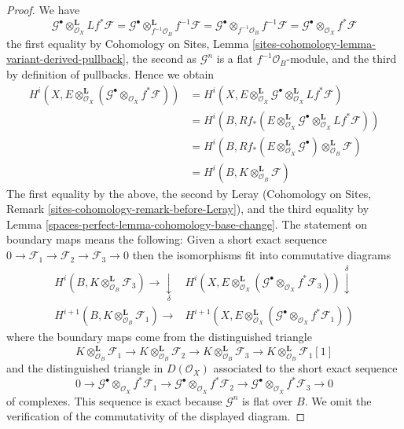 \begin{proof}
We have
$$
\mathcal{G}^\bullet \otimes_{\mathcal{O}_X}^\mathbf{L} Lf^*\mathcal{F} =
\mathcal{G}^\bullet \otimes_{f^{-1}\mathcal{O}_B}^\mathbf{L} f^{-1}\mathcal{F} =
\mathcal{G}^\bullet \otimes_{f^{-1}\mathcal{O}_B} f^{-1}\mathcal{F} =
\mathcal{G}^\bullet \otimes_{\mathcal{O}_X} f^*\mathcal{F}
$$
the first equality by
Cohomology on Sites, Lemma
\ref{sites-cohomology-lemma-variant-derived-pullback},
the second as $\mathcal{G}^n$ is a flat $f^{-1}\mathcal{O}_B$-module, and
the third by definition of pullbacks. Hence we obtain
\begin{align*}
H^i(X, E \otimes^\mathbf{L}_{\mathcal{O}_X}
(\mathcal{G}^\bullet \otimes_{\mathcal{O}_X} f^*\mathcal{F}))
& =
H^i(X, E \otimes^\mathbf{L}_{\mathcal{O}_X} \mathcal{G}^\bullet
\otimes_{\mathcal{O}_X}^\mathbf{L} Lf^*\mathcal{F}) \\
& =
H^i(B,
Rf_*(E \otimes^\mathbf{L}_{\mathcal{O}_X} \mathcal{G}^\bullet
\otimes^\mathbf{L}_{\mathcal{O}_X} Lf^*\mathcal{F})) \\
& =
H^i(B,
Rf_*(E \otimes^\mathbf{L}_{\mathcal{O}_X} \mathcal{G}^\bullet)
\otimes^\mathbf{L}_{\mathcal{O}_B} \mathcal{F}) \\
& =
H^i(B, K \otimes^\mathbf{L}_{\mathcal{O}_B} \mathcal{F})
\end{align*}
The first equality by the above, the second by Leray
(Cohomology on Sites, Remark \ref{sites-cohomology-remark-before-Leray}), and
the third equality by Lemma \ref{spaces-perfect-lemma-cohomology-base-change}.
The statement on boundary maps means the following: Given a short
exact sequence $0 \to \mathcal{F}_1 \to \mathcal{F}_2 \to \mathcal{F}_3 \to 0$
then the isomorphisms fit into commutative diagrams
$$
\begin{array}{cc}H^i(B, K \otimes^\mathbf{L}_{\mathcal{O}_B} \mathcal{F}_3)
\longrightarrow\underset{\delta}{\downarrow} & H^i(X, E \otimes^\mathbf{L}_{\mathcal{O}_X}
(\mathcal{G}^\bullet \otimes_{\mathcal{O}_X} f^*\mathcal{F}_3)) \overset{\delta}{\downarrow} \\ H^{i + 1}(B, K \otimes^\mathbf{L}_{\mathcal{O}_B} \mathcal{F}_1)
\longrightarrow & H^{i + 1}(X, E \otimes^\mathbf{L}_{\mathcal{O}_X}
(\mathcal{G}^\bullet \otimes_{\mathcal{O}_X} f^*\mathcal{F}_1))\end{array}
$$
where the boundary maps come from the distinguished triangle
$$
K \otimes^\mathbf{L}_{\mathcal{O}_B} \mathcal{F}_1 \to
K \otimes^\mathbf{L}_{\mathcal{O}_B} \mathcal{F}_2 \to
K \otimes^\mathbf{L}_{\mathcal{O}_B} \mathcal{F}_3 \to
K \otimes^\mathbf{L}_{\mathcal{O}_B} \mathcal{F}_1[1]
$$
and the distinguished triangle in $D(\mathcal{O}_X)$ associated to
the short exact sequence
$$
0 \to
\mathcal{G}^\bullet \otimes_{\mathcal{O}_X} f^*\mathcal{F}_1 \to
\mathcal{G}^\bullet \otimes_{\mathcal{O}_X} f^*\mathcal{F}_2 \to
\mathcal{G}^\bullet \otimes_{\mathcal{O}_X} f^*\mathcal{F}_3 \to 0
$$
of complexes.
This sequence is exact because $\mathcal{G}^n$ is flat over $B$.
We omit the verification of the commutativity of the displayed diagram.
\end{proof}

